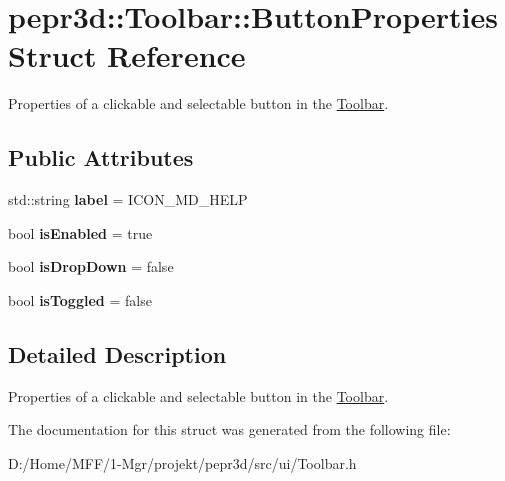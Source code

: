 \hypertarget{structpepr3d_1_1_toolbar_1_1_button_properties}{}\section{pepr3d\+::Toolbar\+::Button\+Properties Struct Reference}
\label{structpepr3d_1_1_toolbar_1_1_button_properties}


Properties of a clickable and selectable button in the \mbox{\hyperlink{classpepr3d_1_1_toolbar}{Toolbar}}.  


\subsection*{Public Attributes}
\begin{DoxyCompactItemize}
\item 
\mbox{\label{structpepr3d_1_1_toolbar_1_1_button_properties_a27e929e1eb3d85e60cd2c0b7e1494d3c}} 
std\+::string {\bfseries label} = I\+C\+O\+N\+\_\+\+M\+D\+\_\+\+H\+E\+LP
\item 
\mbox{\label{structpepr3d_1_1_toolbar_1_1_button_properties_ac47d28b38ac06685a901c8e623060860}} 
bool {\bfseries is\+Enabled} = true
\item 
\mbox{\label{structpepr3d_1_1_toolbar_1_1_button_properties_a8d1b3d99be590b926085c2c43e91e126}} 
bool {\bfseries is\+Drop\+Down} = false
\item 
\mbox{\label{structpepr3d_1_1_toolbar_1_1_button_properties_a2ff9f7a9e7eeba6db62acf91f8355d93}} 
bool {\bfseries is\+Toggled} = false
\end{DoxyCompactItemize}


\subsection{Detailed Description}
Properties of a clickable and selectable button in the \mbox{\hyperlink{classpepr3d_1_1_toolbar}{Toolbar}}. 

The documentation for this struct was generated from the following file\+:\begin{DoxyCompactItemize}
\item 
D\+:/\+Home/\+M\+F\+F/1-\/\+Mgr/projekt/pepr3d/src/ui/Toolbar.\+h\end{DoxyCompactItemize}

